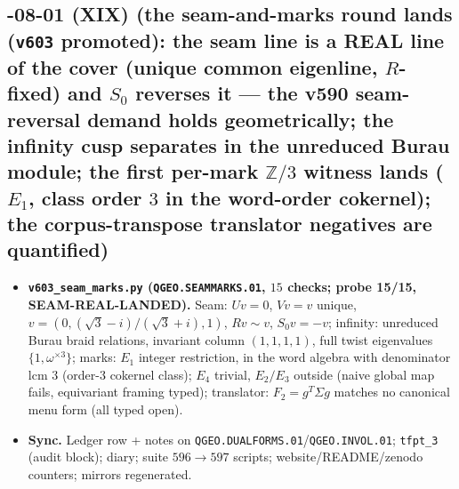 \subsection*{-08-01 (XIX) (the seam-and-marks round lands (\texttt{v603} promoted): the seam line is a REAL line of the cover (unique common eigenline, $R$-fixed) and $S_0$ reverses it --- the v590 seam-reversal demand holds geometrically; the infinity cusp separates in the unreduced Burau module; the first per-mark $\mathbb{Z}/3$ witness lands ($E_1$, class order $3$ in the word-order cokernel); the corpus-transpose translator negatives are quantified)}
\begin{itemize}[leftmargin=1.5em]
\item \textbf{\texttt{v603\_seam\_marks.py} (\texttt{QGEO.SEAMMARKS.01}, $15$ checks; probe
15/15, SEAM-REAL-LANDED).} Seam: $Uv=0$, $Vv=v$ unique, $v=(0,(\sqrt3-i)/(\sqrt3+i),1)$,
$Rv\sim v$, $S_0v=-v$; infinity: unreduced Burau braid relations, invariant column
$(1,1,1,1)$, full twist eigenvalues $\{1,\omega^{\times3}\}$; marks: $E_1$ integer
restriction, in the word algebra with denominator lcm $3$ (order-$3$ cokernel class);
$E_4$ trivial, $E_2/E_3$ outside (naive global map fails, equivariant framing typed);
translator: $F_2=g^T\Sigma g$ matches no canonical menu form (all typed open).
\item \textbf{Sync.} Ledger row + notes on
\texttt{QGEO.DUALFORMS.01}/\texttt{QGEO.INVOL.01}; \texttt{tfpt\_3} (audit block); diary;
suite $596\to597$ scripts; website/README/zenodo counters; mirrors regenerated.
\end{itemize}

